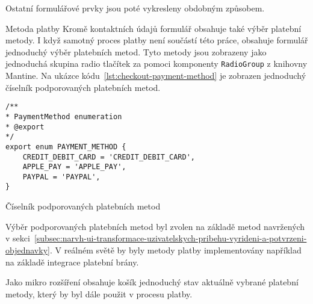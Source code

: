Ostatní formulářové prvky jsou poté vykresleny obdobným způsobem.

\begin{subsection}{Metoda platby}
    \label{subsec:implementace-checkout-payment-method}
    Kromě kontaktních údajů formulář obsahuje také výběr platební metody.
    I když samotný proces platby není součástí této práce, obsahuje formulář jednoduchý výběr platebních metod.
    Tyto metody jsou zobrazeny jako jednoduchá skupina radio tlačítek za pomoci komponenty \texttt{RadioGroup} z knihovny Mantine.
    Na ukázce kódu~\ref{lst:checkout-payment-method} je zobrazen jednoduchý číselník podporovaných platebních metod.

    \begin{listing}[h]
        \begin{verbatim}
/**
* PaymentMethod enumeration
* @export
*/
export enum PAYMENT_METHOD {
	CREDIT_DEBIT_CARD = 'CREDIT_DEBIT_CARD',
	APPLE_PAY = 'APPLE_PAY',
	PAYPAL = 'PAYPAL',
}
        \end{verbatim}
        \caption{Číselník podporovaných platebních metod}
        \label{lst:checkout-payment-method}
    \end{listing}

    Výběr podporovaných platebních metod byl zvolen na základě metod navržených v sekci~\ref{subsec:narvh-ui-transformace-uzivatelskych-pribehu-vyrideni-a-potvrzeni-objednavky}.
    V reálném světě by byly metody platby implementovány například na základě integrace platební brány.

    Jako mikro rozšíření obsahuje košík jednoduchý stav aktuálně vybrané platební metody, který by byl dále použit v procesu platby.
\end{subsection}
\pagebreak

